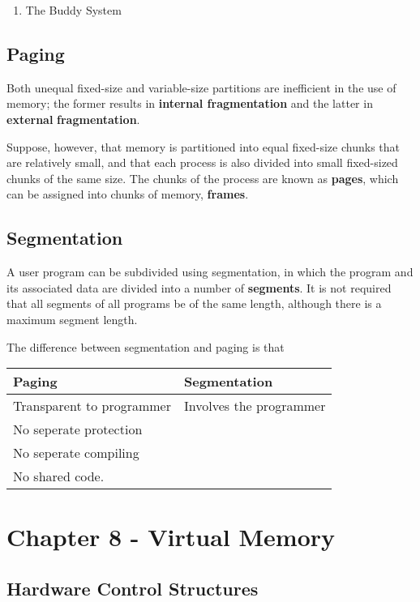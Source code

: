 \documentclass[11pt]{article}
\begin{document}
\begin{enumerate}
\item The Buddy System
\label{sec-1-2-2-1}
\end{enumerate}

\subsection{Paging}
\label{sec-1-3}

Both unequal fixed-size and variable-size partitions are 
inefficient in the use of memory; the former results in
\textbf{internal fragmentation} and the latter in \textbf{external}
\textbf{fragmentation}. 

Suppose, however, that memory is partitioned into equal 
fixed-size chunks that are relatively small, and that 
each process is also divided into small fixed-sized chunks 
of the same size. The chunks of the process are known as
\textbf{pages}, which can be assigned into chunks of memory, \textbf{frames}.

\subsection{Segmentation}
\label{sec-1-4}

A user program can be subdivided using segmentation, in which
the program and its associated data are divided into a number
of \textbf{segments}. It is not required that all segments of all 
programs be of the same length, although there is a maximum 
segment length.

The difference between segmentation and paging is that

\begin{center}
\begin{tabular}{ll}
Paging & Segmentation\\
\hline
Transparent to programmer & Involves the programmer\\
No seperate protection & \\
No seperate compiling & \\
No shared code. & \\
\end{tabular}
\end{center}

\section{Chapter 8 - Virtual Memory}
\label{sec-2}

\subsection{Hardware Control Structures}
\label{sec-2-1}
\end{document}
